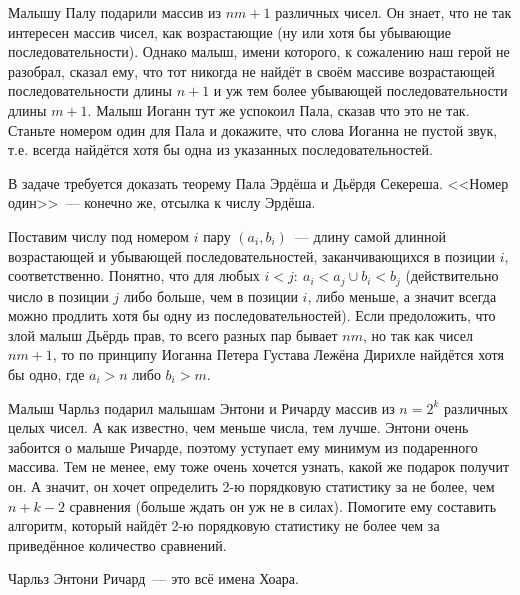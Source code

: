 \documentclass[addpoints]{exam}
\begin{document}
\begin{questions}
\question[1] Малышу Палу подарили массив из $nm + 1$ различных чисел. Он знает, что не так интересен массив чисел, как возрастающие (ну или хотя бы убывающие последовательности). Однако малыш, имени которого, к сожалению наш герой не разобрал, сказал ему, что тот никогда не найдёт в своём массиве возрастающей последовательности длины $n+1$ и уж тем более убывающей последовательности длины $m+1$. Малыш Иоганн тут же успокоил Пала, сказав что это не так. Станьте номером один для Пала и докажите, что слова Иоганна не пустой звук, т.е. всегда найдётся хотя бы одна из указанных последовательностей.

\begin{solution}

В задаче требуется доказать теорему Пала Эрдёша и Дьёрдя Секереша. <<Номер один>>~--- конечно же, отсылка к числу Эрдёша.

Поставим числу под номером $i$ пару $(a_i, b_i)$~--- длину самой длинной возрастающей и убывающей последовательностей, заканчивающихся в позиции $i$, соответственно. Понятно, что для любых $i < j:\ a_i < a_j \cup b_i < b_j$ (действительно число в позиции $j$ либо больше, чем в позиции $i$, либо меньше, а значит всегда можно продлить хотя бы одну из последовательностей). Если предоложить, что злой малыш Дьёрдь прав, то всего разных пар бывает $nm$, но так как чисел $nm+1$, то по принципу Иоганна Петера Густава Лежёна Дирихле найдётся хотя бы одно, где $a_i > n$ либо $b_i > m$.

\end{solution}

\question[1] Малыш Чарльз подарил малышам Энтони и Ричарду массив из $n = 2^k$ различных целых чисел. А как известно, чем меньше числа, тем лучше. Энтони очень забоится о малыше Ричарде, поэтому уступает ему минимум из подаренного массива. Тем не менее, ему тоже очень хочется узнать, какой же подарок получит он. А значит, он хочет определить 2-ю порядковую статистику за не более, чем $n + k - 2$ сравнения (больше ждать он уж не в силах). Помогите ему составить алгоритм, который найдёт 2-ю порядковую статистику не более чем за приведённое количество сравнений.

\begin{solution}

Чарльз Энтони Ричард~--- это всё имена Хоара.



\end{solution}
\end{questions}
\end{document}
